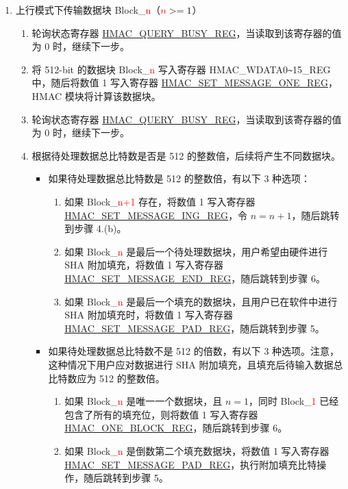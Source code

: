 \documentclass[main\_\_CN.tex]{subfiles}
\begin{document}
\begin{enumerate}
    \item 上行模式下传输数据块 Block\_\textcolor{red}{n}（$\textcolor{red}{n}>=1$）
        \begin{enumerate}
            \item 轮询状态寄存器 \hyperref[regdesc:HMACQUERYBUSYREG]{HMAC\_QUERY\_BUSY\_REG}，当读取到该寄存器的值为 0 时，继续下一步。
            \item 将 512-bit 的数据块 Block\_\textcolor{red}{n} 写入寄存器 HMAC\_WDATA0\verb+~+15\_REG 中，随后将数值 1 写入寄存器 \hyperref[regdesc:HMACSETMESSAGEONEREG]{HMAC\_SET\_MESSAGE\_ONE\_REG}，HMAC 模块将计算该数据块。
            \item 轮询状态寄存器 \hyperref[regdesc:HMACQUERYBUSYREG]{HMAC\_QUERY\_BUSY\_REG}，当读取到该寄存器的值为 0 时，继续下一步。
            \item 根据待处理数据总比特数是否是 512 的整数倍，后续将产生不同数据块。
            \begin{itemize}
                \item 如果待处理数据总比特数是 512 的整数倍，有以下 3 种选项：
                \begin{enumerate}
                    \item 如果 Block\_\textcolor{red}{n+1} 存在，将数值 1 写入寄存器 \hyperref[regdesc:HMACSETMESSAGEINGREG]{HMAC\_SET\_MESSAGE\_ING\_REG}，令 $n=n+1$，随后跳转到步骤 4.(b)。
                    \item 如果 Block\_\textcolor{red}{n} 是最后一个待处理数据块，用户希望由硬件进行 SHA 附加填充，将数值 1 写入寄存器 \hyperref[regdesc:HMACSETMESSAGEENDREG]{HMAC\_SET\_MESSAGE\_END\_REG}，随后跳转到步骤 6。
                    \item 如果 Block\_\textcolor{red}{n} 是最后一个填充的数据块，且用户已在软件中进行 SHA 附加填充时，将数值 1 写入寄存器 \hyperref[regdesc:HMACSETMESSAGEPADREG]{HMAC\_SET\_MESSAGE\_PAD\_REG}，随后跳转到步骤 5。
                \end{enumerate}
                \item 如果待处理数据总比特数不是 512 的倍数，有以下 3 种选项。注意，这种情况下用户应对数据进行 SHA 附加填充，且填充后待输入数据总比特数应为 512 的整数倍。
                \begin{enumerate}
                    \item 如果 Block\_\textcolor{red}{n} 是唯一一个数据块，且 $n=1$，同时 Block\_\textcolor{red}{1} 已经包含了所有的填充位，则将数值 1 写入寄存器 \hyperref[regdesc:HMACONEBLOCKREG]{HMAC\_ONE\_BLOCK\_REG}，随后跳转到步骤 6。
                    \item 如果 Block\_\textcolor{red}{n} 是倒数第二个填充数据块，将数值 1 写入寄存器\\ \hyperref[regdesc:HMACSETMESSAGEPADREG]{HMAC\_SET\_MESSAGE\_PAD\_REG}，执行附加填充比特操作，随后跳转到步骤 5。

\end{enumerate}
\end{itemize}
\end{enumerate}
\end{enumerate}
\end{document}
